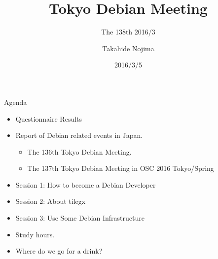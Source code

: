 \title{Tokyo Debian Meeting}
\subtitle{The 138th 2016/3}
\author{Takahide Nojima}
\date{2016/3/5}



\begin{frame}
\titlepage{}
\end{frame}

\begin{frame}{Agenda}
 \begin{minipage}[t]{0.45\hsize}
  \begin{itemize}
   \item Questionnaire Results
   \item Report of Debian related events in Japan.
	 \begin{itemize}
	 \item The 136th Tokyo Debian Meeting.
	 \item The 137th Tokyo Debian Meeting in OSC 2016 Tokyo/Spring
	 \end{itemize}
  \end{itemize}
 \end{minipage} 
 \begin{minipage}[t]{0.45\hsize}
  \begin{itemize}
   \item Session 1: How to become a Debian Developer
   \item Session 2: About tilegx
   \item Session 3: Use Some Debian Infrastructure
   \item Study hours.
   \item Where do we go for a drink?
  \end{itemize}
 \end{minipage}
\end{frame}

